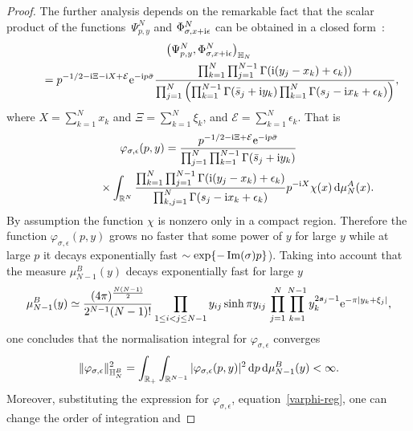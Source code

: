 \begin{proof}
The further analysis depends on the remarkable fact that the scalar product of the func\-ti\-ons~$\Psi^N_{p,y}$ and
$\Phi^N_{\sigma,x+{\rm i}\epsilon}$ can be obtained in a closed form~\cite{Belitsky:2014rba}:
\begin{gather}
\big(\Psi^N_{p, y},\Phi^N_{\sigma,x+{\rm i}\epsilon}\big)_{\mathbb H_N} \nonumber
\\ \qquad
{}=p^{-1/2 -{\rm i}\Xi-{\rm i}X+\mathcal E}{\rm e}^{-{\rm i}p\bar\sigma}\frac{
\prod_{k=1}^N\prod_{j=1}^{N-1} \Gamma({\rm i}(y_j-x_k)+\epsilon_k))
}{\prod_{j=1}^N\left(\prod_{k=1}^{N-1}\Gamma( \bar s_j+{\rm i}y_k)\prod_{k=1}^{N}\Gamma( s_j-{\rm i}x_k+\epsilon_k)\right)},\label{BtoA}
\end{gather}
where $X=\sum_{k=1}^N x_k$ and $\Xi=\sum_{k=1}^N \xi_k$, and $\mathcal E=\sum_{k=1}^N \epsilon_k$. That is
\begin{gather}
\varphi_{\sigma,\epsilon}(p,y)=\frac{p^{-1/2 -{\rm i}\Xi+\mathcal E}{\rm e}^{-{\rm i}p\bar\sigma}}{\prod_{j=1}^N\prod_{k=1}^{N-1}\Gamma( \bar s_j+{\rm i}y_k)}\nonumber
\\ \hphantom{\varphi_{\sigma,\epsilon}(p,y)=}
{}\times\int_{\mathbb R^N}\frac{
\prod_{k=1}^N\prod_{j=1}^{N-1} \Gamma({\rm i}(y_j-x_k)+\epsilon_k)}{\prod_{k,j=1}^{N}\Gamma( s_j-{\rm i}x_k+\epsilon_k)}
 p^{-{\rm i}X} \chi(x)\,{\rm d}\mu_N^A(x). \label{varphi-reg}
\end{gather}
By assumption the function $\chi$ is nonzero only in a compact region. Therefore the function $\varphi_{\sigma,\epsilon}(p,y)$ grows no
faster that some power of $y$ for large $y$ while at large $p$ it decays exponentially fast $\sim \exp\{-\mathop{\rm Im}(\sigma)p\}$). Taking
into account that the measure $\mu_{N-1}^{B}(y)$ decays exponentially fast for large $y$
\begin{gather*}
\mu^B_{N-1}(y) \simeq \frac{(4\pi)^{\frac{N(N-1)}2} }{2^{N-1} (N-1)!}
\prod_{1\leq i<j\leq N-1} {y_{ij}}\sinh\pi y_{ij}\, \prod_{j=1}^N\prod_{k=1}^{N-1} y_k^{2\boldsymbol s_j-1} {\rm e}^{-\pi |y_k+\xi_j|},
\end{gather*}
one concludes that the normalisation integral for $\varphi_{\sigma,\epsilon}$ converges
\begin{gather*}
\|\varphi_{\sigma,\epsilon}\|^2_{\mathbb H_N^B}=\int_{\mathbb R_+}\int_{\mathbb R^{N-1}}
 |\varphi_{\sigma,\epsilon}(p,y)|^2 \,{\rm d}p \,{\rm d}\mu_{N-1}^{B}(y) < \infty.
\end{gather*}
Moreover, substituting the expression for $\varphi_{\sigma,\epsilon}$, equation~\eqref{varphi-reg}, one can change the order of integration and

\end{proof}

